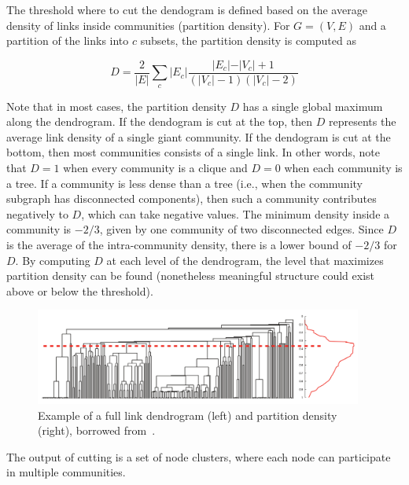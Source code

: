 The threshold where to cut the dendogram is defined
based on the average density of links inside communities (partition density).
For $G=(V,E)$ and a partition of the links into $c$ subsets, the partition density is computed as

\begin{equation}
D = \frac{2}{\vert E \vert} \sum_c \vert E_c \vert \frac{\vert E_c \vert - \vert V_c \vert + 1 }{(\vert V_c \vert -1)(\vert V_c \vert -2)}
\end{equation}

Note that in most cases, the partition density $D$ has a single
global maximum along the dendrogram. 
If the dendogram is cut at the top, then $D$ represents the
average link density of a single
giant community.  If the dendogram is cut at the
bottom, then most communities consists of a single
link. In other words, note that $D = 1$ when every community
is a clique and $D = 0$ when each community is a
tree. If a community is less dense than a tree (i.e., when the
community subgraph has disconnected components), then such a community
contributes negatively to $D$, which can take negative values. The
minimum density inside a community is $-2/3$, given by one community
of two disconnected edges. Since $D$ is the average of the
intra-community density, there is a lower bound of $-2/3$ for
$D$. By computing $D$ at each level of the dendrogram, 
the level that maximizes partition density can be found 
(nonetheless meaningful
structure could exist above or below the threshold).

\begin{figure}[htbp]
  \centering
    \includegraphics[clip,width=0.96\textwidth]{figures/figure0.png}
  \caption[Example of a full link dendrogram (left) and partition density (right)]%
  {Example of a full link dendrogram (left) and partition density (right), borrowed from~\cite{ahn2010link}.}
  \label{fig:hlc_density}
\end{figure}

The output of
cutting is a set of node clusters, where each node can participate in
multiple communities.

